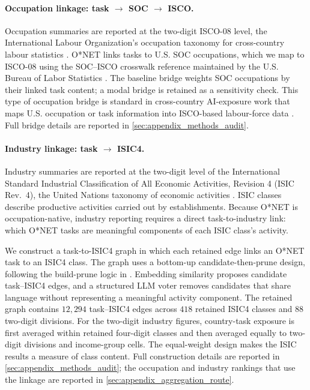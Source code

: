 \documentclass[11pt]{article}
\begin{document}
\paragraph{Occupation linkage: task $\rightarrow$ SOC $\rightarrow$ ISCO.} Occupation summaries are reported at the two-digit ISCO-08 level, the International Labour Organization's occupation taxonomy for cross-country labour statistics \citep{isco08}. O*NET links tasks to U.S. SOC occupations, which we map to ISCO-08 using the SOC--ISCO crosswalk reference maintained by the U.S. Bureau of Labor Statistics \citep{bls_soc_isco_crosswalk}. The baseline bridge weights SOC occupations by their linked task content; a modal bridge is retained as a sensitivity check. This type of occupation bridge is standard in cross-country AI-exposure work that maps U.S. occupation or task information into ISCO-based labour-force data \citep{PizzinelliEtAl2023,CazzanigaEtAl2024,GmyrekBergBescond2023}. Full bridge details are reported in \ref{sec:appendix_methods_audit}.

\paragraph{Industry linkage: task $\rightarrow$ ISIC4.} Industry summaries are reported at the two-digit level of the International Standard Industrial Classification of All Economic Activities, Revision 4 (ISIC Rev.~4), the United Nations taxonomy of economic activities \citep{isicrev4}. ISIC classes describe productive activities carried out by establishments. Because O*NET is occupation-native, industry reporting requires a direct task-to-industry link: which O*NET tasks are meaningful components of each ISIC class's activity.

We construct a task-to-ISIC4 graph in which each retained edge links an O*NET task to an ISIC4 class. The graph uses a bottom-up candidate-then-prune design, following the build-prune logic in \citet{FetzerLambertFeldGarg2024AIPNET}. Embedding similarity proposes candidate task--ISIC4 edges, and a structured LLM voter removes candidates that share language without representing a meaningful activity component. The retained graph contains $12{,}294$ task--ISIC4 edges across $418$ retained ISIC4 classes and $88$ two-digit divisions. For the two-digit industry figures, country-task exposure is first averaged within retained four-digit classes and then averaged equally to two-digit divisions and income-group cells. The equal-weight design makes the ISIC results a measure of class content. Full construction details are reported in \ref{sec:appendix_methods_audit}; the occupation and industry rankings that use the linkage are reported in \ref{sec:appendix_aggregation_route}.
\end{document}

